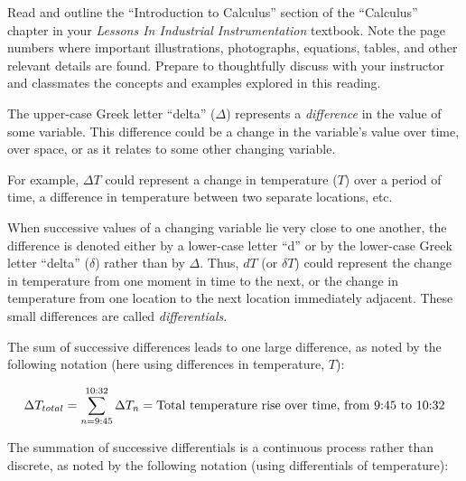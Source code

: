 

Read and outline the ``Introduction to Calculus'' section of the ``Calculus'' chapter in your {\it Lessons In Industrial Instrumentation} textbook.  Note the page numbers where important illustrations, photographs, equations, tables, and other relevant details are found.  Prepare to thoughtfully discuss with your instructor and classmates the concepts and examples explored in this reading.














The upper-case Greek letter ``delta'' ($\Delta$) represents a {\it difference} in the value of some variable.  This difference could be a change in the variable's value over time, over space, or as it relates to some other changing variable.

For example, $\Delta T$ could represent a change in temperature ($T$) over a period of time, a difference in temperature between two separate locations, etc.

\vskip 10pt

When successive values of a changing variable lie very close to one another, the difference is denoted either by a lower-case letter ``d'' or by the lower-case Greek letter ``delta'' ($\delta$) rather than by $\Delta$.  Thus, $dT$ (or $\delta T$) could represent the change in temperature from one moment in time to the next, or the change in temperature from one location to the next location immediately adjacent.  These small differences are called {\it differentials}.

\vskip 10pt

The sum of successive differences leads to one large difference, as noted by the following notation (here using differences in temperature, $T$):

$$\Delta T_{total} = \sum_{n=9:45}^{10:32} \Delta T_n = \hbox{Total temperature rise over time, from 9:45 to 10:32}$$

The summation of successive differentials is a continuous process rather than discrete, as noted by the following notation (using differentials of temperature):

